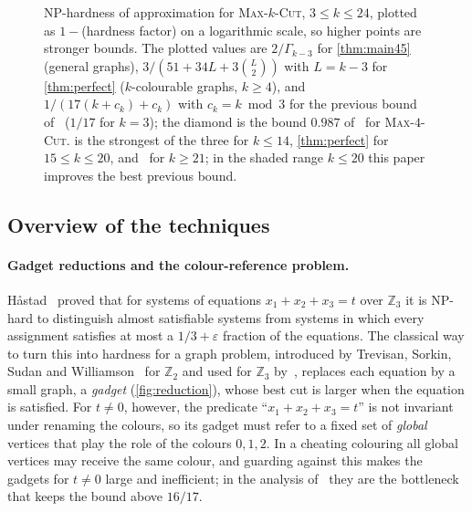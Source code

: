 \documentclass[11pt,letterpaper]{article}
\theoremstyle{remark}
\newcommand{\MC}[1]{\textup{\textsc{Max-$#1$-Cut}}}
\newcommand{\Z}{\mathbb{Z}}
\newcommand{\eps}{\varepsilon}
\begin{document}
\begin{figure}[t]
\centering

\caption{NP-hardness of approximation for \MC{k}, $3\le k\le24$, plotted as $1-{}$(hardness factor) on a
logarithmic scale, so higher points are stronger bounds. The plotted values are $2/\Gamma_{k-3}$ for
\cref{thm:main45} (general graphs), $3/(51+34L+3\binom L2)$ with $L=k-3$ for \cref{thm:perfect}
($k$-colourable graphs, $k\ge4$), and $1/(17(k+c_k)+c_k)$ with $c_k=k\bmod3$ for the previous bound
of~\cite{AOTW14} ($1/17$ for $k=3$); the diamond is the bound $0.987$ of~\cite{NRT25} for \MC{4}.
 is the strongest of the three for $k\le14$, \cref{thm:perfect} for $15\le k\le20$,
and~\cite{AOTW14} for $k\ge21$; in the shaded range $k\le20$ this paper improves the best previous bound.}
\label{fig:bounds}
\end{figure}


\subsection{Overview of the techniques}

\paragraph{Gadget reductions and the colour-reference problem.}
H\aa stad~\cite{Hastad01} proved that for systems of equations $x_1+x_2+x_3 = t$ over $\Z_3$ it is NP-hard
to distinguish almost satisfiable systems from systems in which every assignment satisfies at most a
$1/3+\eps$ fraction of the equations. The classical way to turn this into hardness for a graph problem,
introduced by Trevisan, Sorkin, Sudan and Williamson~\cite{TSSW00} for $\Z_2$ and used for $\Z_3$
by~\cite{NRT25}, replaces each equation by a small graph, a \emph{gadget} (\cref{fig:reduction}), whose best cut is larger when
the equation is satisfied. For $t\ne0$, however, the predicate ``$x_1+x_2+x_3=t$'' is not invariant under
renaming the colours, so its gadget must refer to a fixed set of \emph{global} vertices that play the role
of the colours $0,1,2$. In a cheating colouring all global vertices may receive the same colour, and
guarding against this makes the gadgets for $t\ne0$ large and inefficient; in the analysis
of~\cite{NRT25} they are the bottleneck that keeps the bound above $16/17$.
\end{document}
